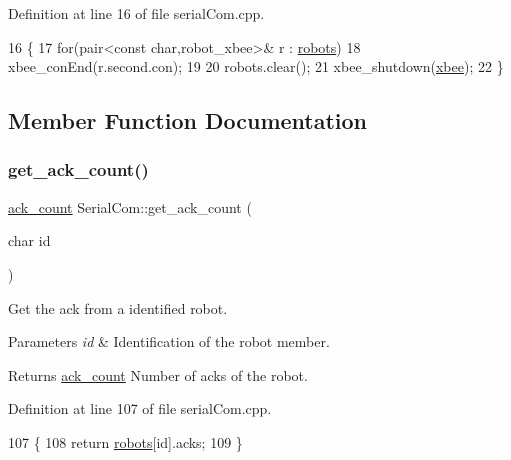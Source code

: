 Definition at line 16 of file serial\+Com.\+cpp.


\begin{DoxyCode}
16                      \{
17     \textcolor{keywordflow}{for}(pair<const char,robot\_xbee>& r : \hyperlink{class_serial_com_ae20f6fe8f53cb581b285924eda5ad01c}{robots})
18         xbee\_conEnd(r.second.con);
19 
20     robots.clear();
21     xbee\_shutdown(\hyperlink{class_serial_com_ad5b8e665ab2218ad6caedd59738a7c12}{xbee});
22 \}
\end{DoxyCode}


\subsection{Member Function Documentation}
\mbox{\label{class_serial_com_af3bb19785d37bfbd6fde36e107fed1b1}} 
\subsubsection{\texorpdfstring{get\+\_\+ack\+\_\+count()}{get\_ack\_count()}}
{\footnotesize\ttfamily \hyperlink{structack__count}{ack\+\_\+count} Serial\+Com\+::get\+\_\+ack\+\_\+count (\begin{DoxyParamCaption}\item[{char}]{id }\end{DoxyParamCaption})}



Get the ack from a identified robot. 


\begin{DoxyParams}{Parameters}
{\em id} & Identification of the robot member. \\
\hline
\end{DoxyParams}
\begin{DoxyReturn}{Returns}
\hyperlink{structack__count}{ack\+\_\+count} Number of acks of the robot. 
\end{DoxyReturn}


Definition at line 107 of file serial\+Com.\+cpp.


\begin{DoxyCode}
107                                           \{
108     \textcolor{keywordflow}{return} \hyperlink{class_serial_com_ae20f6fe8f53cb581b285924eda5ad01c}{robots}[id].acks;
109 \}
\end{DoxyCode}
\mbox{\label{class_serial_com_a31bc443df9f0d736ff9c06e7dcb4ecb6}} 
